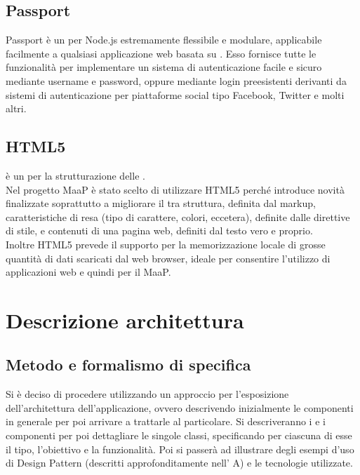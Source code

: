 \subsection{Passport}
Passport è un  per Node.js estremamente flessibile e modulare, applicabile facilmente a qualsiasi applicazione web basata su . Esso fornisce tutte le funzionalità per implementare un sistema di autenticazione facile e sicuro mediante username e password, oppure mediante login preesistenti derivanti da sistemi di autenticazione per piattaforme social tipo Facebook, Twitter e molti altri.

\subsection{HTML5}
 è un  per la strutturazione delle .\\
Nel progetto MaaP è stato scelto di utilizzare HTML5 perché introduce novità finalizzate soprattutto a migliorare il  tra struttura, definita dal markup, caratteristiche di resa (tipo di carattere, colori, eccetera), definite dalle direttive di stile, e contenuti di una pagina web, definiti dal testo vero e proprio.\\
Inoltre HTML5 prevede il supporto per la memorizzazione locale di grosse quantità di dati scaricati dal web browser, ideale per consentire l'utilizzo di applicazioni web e quindi per il  MaaP.

\newpage
\section{Descrizione architettura}
\subsection{Metodo e formalismo di specifica}
Si è deciso di procedere utilizzando un approccio  per l'esposizione dell'architettura dell'applicazione, ovvero descrivendo inizialmente le componenti in generale per poi arrivare a trattarle al particolare.
Si descriveranno i  e i componenti per poi dettagliare le singole classi, specificando per ciascuna di esse il tipo, l'obiettivo e la funzionalità. Poi si passerà ad illustrare degli esempi d'uso di Design Pattern (descritti approfonditamente nell' A) e le tecnologie utilizzate.

